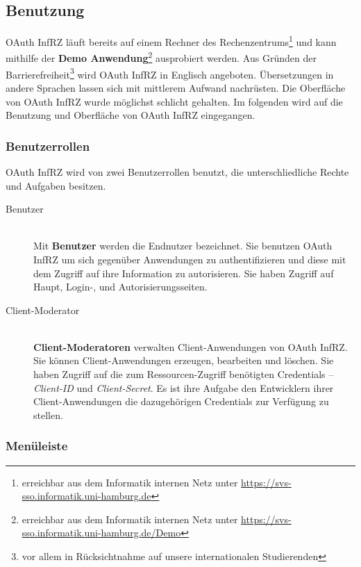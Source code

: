 \documentclass[12pt,a4paper,pointednumbers,abstracton]{scrartcl}
\begin{document}
\subsection{Benutzung}
\label{sec:oauth-infrz/usage}

OAuth InfRZ läuft bereits auf einem Rechner des Rechenzentrums\footnote{erreichbar aus dem Informatik internen Netz unter \url{https://svs-sso.informatik.uni-hamburg.de}} und kann mithilfe der \textbf{Demo Anwendung}\footnote{erreichbar aus dem Informatik internen Netz unter \url{https://svs-sso.informatik.uni-hamburg.de/Demo}} ausprobiert werden.
Aus Gründen der Barrierefreiheit\footnote{vor allem in Rücksichtnahme auf unsere internationalen Studierenden} wird OAuth InfRZ in Englisch angeboten.
Übersetzungen in andere Sprachen lassen sich mit mittlerem Aufwand nachrüsten.
Die Oberfläche von OAuth InfRZ wurde möglichst schlicht gehalten.
Im folgenden wird auf die Benutzung und Oberfläche von OAuth InfRZ eingegangen.

\subsubsection{Benutzerrollen}

OAuth InfRZ wird von zwei Benutzerrollen benutzt, die unterschliedliche Rechte und Aufgaben besitzen.

\begin{description}
	\item[Benutzer] \hfill \\
		Mit \textbf{Benutzer} werden die Endnutzer bezeichnet.
		Sie benutzen OAuth InfRZ um sich gegenüber Anwendungen zu authentifizieren und diese mit dem Zugriff auf ihre Information zu autorisieren. 
		Sie haben Zugriff auf Haupt, Login-, und Autorisierungsseiten.
	\item[Client-Moderator] \hfill \\
		\textbf{Client-Moderatoren} verwalten Client-Anwendungen von OAuth InfRZ.
		Sie können Client-Anwendungen erzeugen, bearbeiten und löschen.
		Sie haben Zugriff auf die zum Ressourcen-Zugriff benötigten Credentials -- \emph{Client-ID} und \emph{Client-Secret}.
		Es ist ihre Aufgabe den Entwicklern ihrer Client-Anwendungen die dazugehörigen Credentials zur Verfügung zu stellen.
\end{description}

\subsubsection{Menüleiste}
\end{document}
